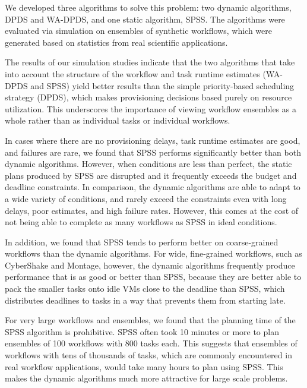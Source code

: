\documentclass[preprint,5p]{elsarticle}
\begin{document}
We developed three algorithms to solve this problem: two dynamic algorithms,
DPDS and WA-DPDS, and one static algorithm, SPSS. The algorithms were
evaluated via simulation on ensembles of synthetic workflows, which were
generated based on statistics from real scientific applications.

The results of our simulation studies indicate that the two algorithms that
take into account the structure of the workflow and task runtime estimates
(WA-DPDS and SPSS) yield better results than the simple priority-based
scheduling strategy (DPDS), which makes provisioning decisions based purely on
resource utilization. This underscores the importance of viewing workflow
ensembles as a whole rather than as individual tasks or individual workflows.

In cases where there are no provisioning delays, task runtime estimates are
good, and failures are rare, we found that SPSS performs significantly better
than both dynamic algorithms. However, when conditions are less than perfect,
the static plans produced by SPSS are disrupted and it frequently exceeds the
budget and deadline constraints. In comparison, the dynamic algorithms are able
to adapt to a wide variety of conditions, and rarely exceed the constraints even
with long delays, poor estimates, and high failure rates. However, this comes
at the cost of not being able to complete as many workflows as SPSS in ideal
conditions.

In addition, we found that SPSS tends to perform better on coarse-grained
workflows than the dynamic algorithms. For wide, fine-grained workflows, such
as CyberShake and Montage, however, the dynamic algorithms frequently produce
performance that is as good or better than SPSS, because they are better able
to pack the smaller tasks onto idle VMs close to the deadline than SPSS,
which distributes deadlines to tasks in a way that prevents them from
starting late.

For very large workflows and ensembles, we found that the planning time of
the SPSS algorithm is prohibitive. SPSS often took 10 minutes or more to plan
ensembles of 100 workflows with 800 tasks each. This suggests that ensembles
of workflows with tens of thousands of tasks, which are commonly encountered
in real workflow applications, would take many hours to plan using SPSS. This
makes the dynamic algorithms much more attractive for large scale problems.
\end{document}
